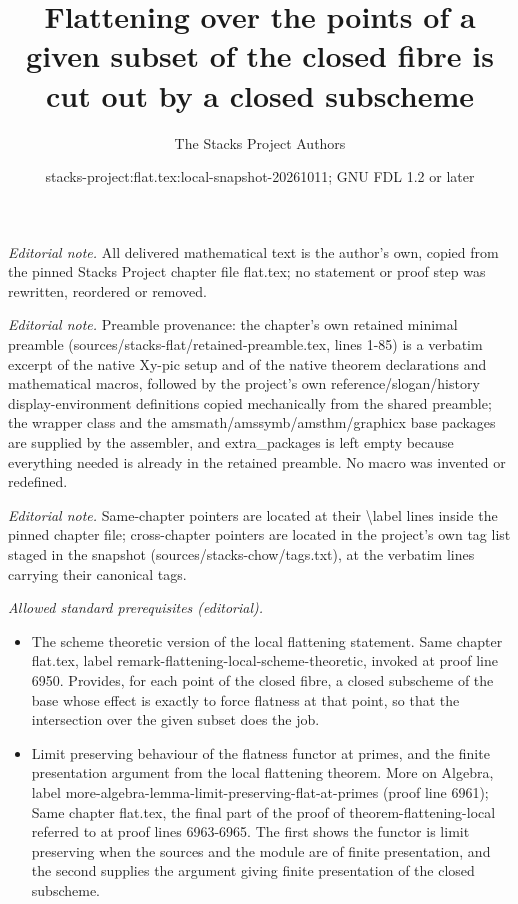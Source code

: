 \documentclass[10pt,a4paper]{amsart}
\title{Flattening over the points of a given subset of the closed fibre is cut out by a closed subscheme}
\author{The Stacks Project Authors}
\date{stacks-project:flat.tex:local-snapshot-20261011; GNU FDL 1.2 or later}
\theoremstyle{plain}
\theoremstyle{definition}
\theoremstyle{remark}
\numberwithin{equation}{subsection}
\begin{document}
\maketitle
\noindent\textit{Editorial note.} All delivered mathematical text is the author's own, copied from the pinned Stacks Project chapter file flat.tex; no statement or proof step was rewritten, reordered or removed.\par\medskip
\noindent\textit{Editorial note.} Preamble provenance: the chapter's own retained minimal preamble (sources/stacks-flat/retained-preamble.tex, lines 1-85) is a verbatim excerpt of the native Xy-pic setup and of the native theorem declarations and mathematical macros, followed by the project's own reference/slogan/history display-environment definitions copied mechanically from the shared preamble; the wrapper class and the amsmath/amssymb/amsthm/graphicx base packages are supplied by the assembler, and extra\_packages is left empty because everything needed is already in the retained preamble. No macro was invented or redefined.\par\medskip
\noindent\textit{Editorial note.} Same-chapter pointers are located at their \textbackslash{}label lines inside the pinned chapter file; cross-chapter pointers are located in the project's own tag list staged in the snapshot (sources/stacks-chow/tags.txt), at the verbatim lines carrying their canonical tags.\par\medskip
\noindent\textit{Allowed standard prerequisites (editorial).}\begin{itemize}
\item The scheme theoretic version of the local flattening statement. Same chapter flat.tex, label remark-flattening-local-scheme-theoretic, invoked at proof line 6950. Provides, for each point of the closed fibre, a closed subscheme of the base whose effect is exactly to force flatness at that point, so that the intersection over the given subset does the job.
\item Limit preserving behaviour of the flatness functor at primes, and the finite presentation argument from the local flattening theorem. More on Algebra, label more-algebra-lemma-limit-preserving-flat-at-primes (proof line 6961); Same chapter flat.tex, the final part of the proof of theorem-flattening-local referred to at proof lines 6963-6965. The first shows the functor is limit preserving when the sources and the module are of finite presentation, and the second supplies the argument giving finite presentation of the closed subscheme.
\end{itemize}\medskip
\end{document}
